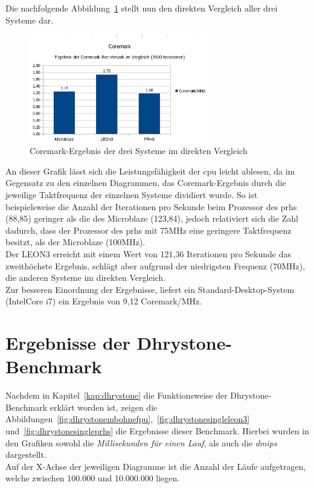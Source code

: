 Die nachfolgende Abbildung~\ref{fig:coremarkresult} stellt nun den direkten Vergleich aller drei Systeme dar.\\

\begin{figure}[H]
\centering
\includegraphics[width=0.7\textwidth]{Hauptteil/coremarkresult.png}
\caption{Coremark-Ergebnis der drei Systeme im direkten Vergleich}
\label{fig:coremarkresult}
\end{figure}

An dieser Grafik lässt sich die Leistungsfähigkeit der \ac{cpu} leicht ablesen, da im Gegensatz zu den einzelnen Diagrammen, das Coremark-Ergebnis durch die jeweilige Taktfrequenz der
einzelnen Systeme dividiert wurde. So ist beispielsweise die Anzahl der Iterationen pro Sekunde beim Prozessor des \ac{prhs} (88,85) geringer als die des Microblaze (123,84), jedoch
relativiert sich die Zahl dadurch, dass der Prozessor des \ac{prhs} mit 75MHz eine geringere Taktfrequenz besitzt, als der Microblaze (100MHz). \\
Der LEON3 erreicht mit einem Wert von 121,36 Iterationen pro Sekunde das zweithöchste Ergebnis, schlägt aber aufgrund der niedrigsten Frequenz (70MHz), die anderen Systeme im direkten Vergleich.\\
Zur besseren Einordnung der Ergebnisse, liefert ein Standard-Desktop-System (IntelCore i7) ein Ergebnis von 9,12 Coremark/MHz.\\

\section{Ergebnisse der Dhrystone-Benchmark}\label{kap:dhrystonetest}

Nachdem in Kapitel~\ref{kap:dhrystone} die Funktionsweise der Dhrystone-Benchmark erklärt worden ist, zeigen die Abbildungen~\ref{fig:dhrystonembohnefpu},~\ref{fig:dhrystonesingleleon3} und~\ref{fig:dhrystonesingleprhs} die Ergebnisse
dieser Benchmark. Hierbei wurden in den Grafiken sowohl die \emph{Millisekunden für einen Lauf}, als auch die \emph{\ac{dmips}} dargestellt. \\
Auf der X-Achse der jeweiligen Diagramme ist die Anzahl
der Läufe aufgetragen, welche zwischen 100.000 und 10.000.000 liegen.\\


